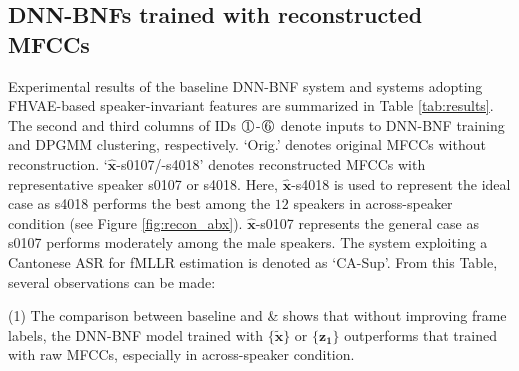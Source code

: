 \documentclass[a4paper]{article}
\def\X#1{%
        \raisebox{.9pt}{\textcircled{\raisebox{-.9pt}{#1}}}%
}
\begin{document}
\subsection{DNN-BNFs trained with reconstructed MFCCs}
Experimental results of the baseline DNN-BNF system and systems adopting FHVAE-based speaker-invariant features  are summarized in Table \ref{tab:results}.
The second and third columns of IDs $\X1$-$\X6$  denote inputs to DNN-BNF training and DPGMM clustering, respectively. 
`Orig.' denotes original MFCCs without reconstruction. `$\bm{\hat{x}}$-s0107/-s4018' denotes reconstructed MFCCs with representative speaker s0107 or s4018.
Here, $\bm{\hat{x}}$-s4018 is used to  represent the ideal case as s4018 performs the best among the $12$ speakers in across-speaker condition (see Figure \ref{fig:recon_abx}).
$\bm{\hat{x}}$-s0107 represents the general case as s0107 performs moderately
among  the male speakers. 
The system exploiting a  Cantonese ASR for fMLLR estimation \cite{Feng2018exploiting} is denoted as `CA-Sup'. From this Table, several observations can be made:

(1) The comparison between  baseline and \X1 \& \X2 shows that without improving frame labels, the DNN-BNF model trained with  $\{\bm{\tilde{x}}\}$ or $\{\bm{z_1}\}$ outperforms that trained with raw MFCCs, especially in across-speaker condition.
\end{document}
